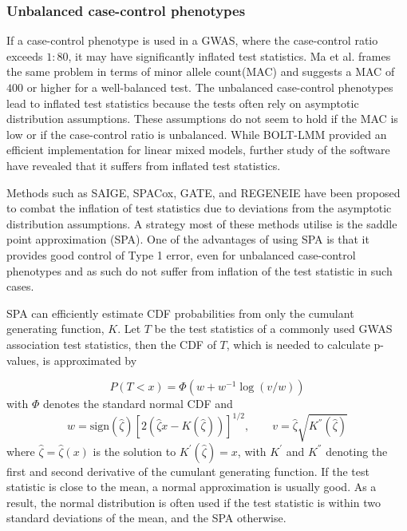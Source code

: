 \subsubsection{Unbalanced case-control phenotypes}
If a case-control phenotype is used in a GWAS, where the case-control ratio exceeds $ 1{:}80 $, it may have significantly inflated test statistics\cite{zhou2018efficiently,}. Ma et al. frames the same problem in terms of minor allele count(MAC) and suggests a MAC of $ 400 $ or higher for a well-balanced test\cite{ma2013recommended}. The unbalanced case-control phenotypes lead to inflated test statistics because the tests often rely on asymptotic distribution assumptions. These assumptions do not seem to hold if the MAC is low or if the case-control ratio is unbalanced. While BOLT-LMM provided an efficient implementation for linear mixed models, further study of the software have revealed that it suffers from inflated test statistics.

Methods such as SAIGE\cite{zhou2018efficiently}, SPACox\cite{bi2020fast}, GATE\cite{dey2022efficient}, and REGENEIE\cite{mbatchou2021computationally} have been proposed to combat the inflation of test statistics due to deviations from the asymptotic distribution assumptions. A strategy most of these methods utilise is the saddle point approximation (SPA)\cite{daniels1954saddlepoint,kuonen1999miscellanea}. One of the advantages of using SPA is that it provides good control of Type 1 error, even for unbalanced case-control phenotypes and as such do not suffer from inflation of the test statistic in such cases\cite{mbatchou2021computationally}.

SPA can efficiently estimate CDF probabilities from only the cumulant generating function, $ K $. Let $ T $ be the test statistics of a commonly used GWAS association test statistics, then the CDF of $ T $, which is needed to calculate p-values, is approximated by

\begin{equation}
P(T < x) = \Phi\left( w + w^{-1} \log(v/w)\right)
\end{equation}
with $ \Phi $ denotes the standard normal CDF and
\begin{equation}
w = \text{sign}(\hat{\zeta})\left[2\left(\hat{\zeta} x - K(\hat{\zeta})\right) \right]^{1/2},
 \qquad 
v = \hat{\zeta}\sqrt{K^{''}(\hat{\zeta})}
\end{equation}
where $ \hat{\zeta} = \hat{\zeta}(x) $ is the solution to $ K^{'}(\hat{\zeta}) = x $, with $ K^{'} $ and $ K^{''} $ denoting the first and second derivative of the cumulant generating function. If the test statistic is close to the mean, a normal approximation is usually good. As a result, the normal distribution is often used if the test statistic is within two standard deviations of the mean, and the SPA otherwise.



